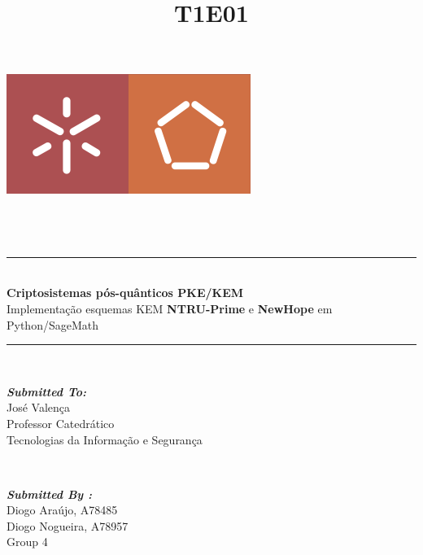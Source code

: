 \documentclass[12pt]{report}
\title{T1E01}
\begin{document}
    
\begin{titlepage}
	\centering
    \vspace*{0.5 cm}
    \includegraphics[scale = 0.50]{logo.png}\\[1.0 cm]	%
	\\[0.1 cm]
	\\[3.0 cm]
	\\[0.5 cm]				%
	\rule{\linewidth}{0.2 mm} \\[0.4 cm]
	{ \huge \bfseries Criptosistemas pós-quânticos PKE/KEM}\\[0.3 cm]
	{ \LARGE Implementação esquemas KEM \textbf{NTRU-Prime} e \textbf{NewHope} em Python/SageMath}
	\rule{\linewidth}{0.2 mm} \\[3.5 cm]
	
	\begin{minipage}{0.4\textwidth}
		\begin{flushleft} \large
			\emph{\textbf{Submitted To:}}\\
			José Valença\\
            Professor Catedrático\\
             Tecnologias da Informação e Segurança\\
			\end{flushleft}
			\end{minipage}~
			\begin{minipage}{0.4\textwidth}
            
			\begin{flushright} \large
			\emph{\textbf{Submitted By :}} \\
			Diogo Araújo, A78485\\
		Diogo Nogueira, A78957\\
            Group 4\\
		\end{flushright}
        
	\end{minipage}\\[2 cm]

	
\end{titlepage}
    
\end{document}
